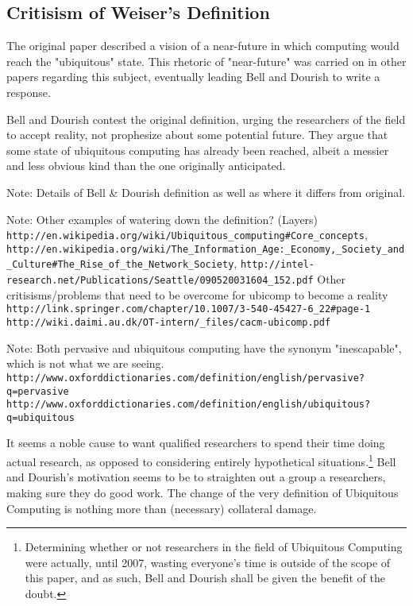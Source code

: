 \subsection{Critisism of Weiser's Definition}

The original paper described a vision of a near-future in which computing would reach the "ubiquitous" state.
This rhetoric of "near-future" was carried on in other papers regarding this subject, eventually leading Bell
and Dourish to write a response.

Bell and Dourish contest the original definition, urging the researchers of the field to accept reality, not
prophesize about some potential future. They argue that some state of ubiquitous computing has already been
reached, albeit a messier and less obvious kind than the one originally anticipated.

Note: Details of Bell \& Dourish definition as well as where it differs from original.\cite{bell07}

Note:
Other examples of watering down the definition? (Layers)
\verb+http://en.wikipedia.org/wiki/Ubiquitous_computing#Core_concepts+,
\verb+http://en.wikipedia.org/wiki/The_Information_Age:_Economy,_Society_and_Culture#The_Rise_of_the_Network_Society+,
\verb+http://intel-research.net/Publications/Seattle/090520031604_152.pdf+
Other critisisms/problems that need to be overcome for ubicomp to become a reality
\verb+http://link.springer.com/chapter/10.1007/3-540-45427-6_22#page-1+
\verb+http://wiki.daimi.au.dk/OT-intern/_files/cacm-ubicomp.pdf+

Note: Both pervasive and ubiquitous computing have the synonym "inescapable", which is not what we are seeing.
\verb+http://www.oxforddictionaries.com/definition/english/pervasive?q=pervasive+
\verb+http://www.oxforddictionaries.com/definition/english/ubiquitous?q=ubiquitous+

It seems a noble cause to want qualified researchers to spend their time doing actual research, as opposed to
considering entirely hypothetical situations.\footnote{Determining whether or not researchers in the field of
Ubiquitous Computing were actually, until 2007, wasting everyone's time is outside of the scope of this paper,
and as such, Bell and Dourish shall be given the benefit of the doubt.} Bell and Dourish's motivation seems to
be to straighten out a group a researchers, making sure they do good work. The change of the very definition of
Ubiquitous Computing is nothing more than (necessary) collateral damage.

